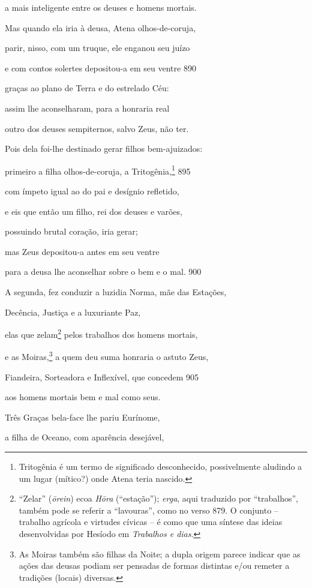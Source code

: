 a mais inteligente entre os deuses e homens mortais.

Mas quando ela iria à deusa, Atena olhos-de-coruja,

parir, nisso, com um truque, ele enganou seu juízo

e com contos solertes depositou-a em seu ventre \num{890}

graças ao plano de Terra e do estrelado Céu:

assim lhe aconselharam, para a honraria real

outro dos deuses sempiternos, salvo Zeus, não ter.

Pois dela foi-lhe destinado gerar filhos bem-ajuizados:

primeiro a filha olhos-de-coruja, a Tritogênia,\footnote{Tritogênia é um termo de significado desconhecido, possivelmente
aludindo a um lugar (mítico?) onde Atena teria nascido.} \num{895}

com ímpeto igual ao do pai e desígnio refletido,

e eis que então um filho, rei dos deuses e varões,

possuindo brutal coração, iria gerar;

mas Zeus depositou-a antes em seu ventre

para a deusa lhe aconselhar sobre o bem e o mal. \num{900}

\quad{}A segunda, fez conduzir a luzidia Norma, mãe das Estações,

Decência, Justiça e a luxuriante Paz,

elas que zelam\footnote{``Zelar'' (\emph{ōrein}) ecoa \emph{Hōra} (``estação'');
\emph{erga}, aqui traduzido por ``trabalhos'', também pode se referir a
``lavouras'', como no verso 879. O conjunto -- trabalho agrícola e
virtudes cívicas -- é como que uma síntese das ideias desenvolvidas por
Hesíodo em \emph{Trabalhos e dias}.} pelos trabalhos dos homens mortais,

e as Moiras,\footnote{As Moiras também são filhas da Noite; a dupla origem parece indicar que as ações das deusas podiam ser pensadas de formas distintas e/ou
remeter a tradições (locais) diversas.} a quem deu suma honraria o astuto Zeus,

Fiandeira, Sorteadora e Inflexível, que concedem \num{905}

aos homens mortais bem e mal como seus.

\quad{}Três Graças bela-face lhe pariu Eurínome,

a filha de Oceano, com aparência desejável,

